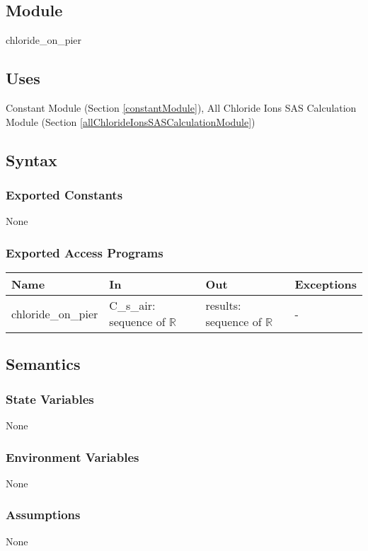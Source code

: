 \documentclass[12pt, titlepage]{article}
\begin{document}
\subsection{Module}
chloride\_on\_pier

\subsection{Uses}

Constant Module (Section \ref{constantModule}), All Chloride Ions SAS Calculation Module (Section \ref{allChlorideIonsSASCalculationModule})

\subsection{Syntax}

\subsubsection{Exported Constants}
None
\subsubsection{Exported Access Programs}

\begin{center}
\begin{tabular}{p{4cm} p{4.5cm} p{4cm} p{2cm}}
\hline
\textbf{Name} & \textbf{In} & \textbf{Out} & \textbf{Exceptions} \\
\hline
chloride\_on\_pier & C\_s\_air: sequence of $\mathbb{R}$ & results: sequence of $\mathbb{R}$ & - \\

\hline
\end{tabular}
\end{center}

\subsection{Semantics}

\subsubsection{State Variables}
None

\subsubsection{Environment Variables}
None
\subsubsection{Assumptions}
None
\end{document}

